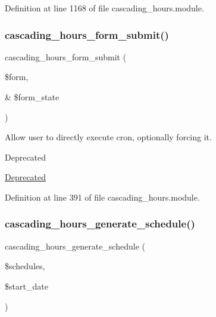 Definition at line 1168 of file cascading\+\_\+hours.\+module.

\mbox{\label{cascading__hours_8module_adb3cde4f8150586f9a97b429e9b35a62_adb3cde4f8150586f9a97b429e9b35a62}} 
\subsubsection{\texorpdfstring{cascading\+\_\+hours\+\_\+form\+\_\+submit()}{cascading\_hours\_form\_submit()}}
{\footnotesize\ttfamily cascading\+\_\+hours\+\_\+form\+\_\+submit (\begin{DoxyParamCaption}\item[{}]{\$form,  }\item[{\&}]{\$form\+\_\+state }\end{DoxyParamCaption})}



Allow user to directly execute cron, optionally forcing it. 

\begin{DoxyRefDesc}{Deprecated}
\item[\hyperlink{deprecated__deprecated000002}{Deprecated}]\end{DoxyRefDesc}


Definition at line 391 of file cascading\+\_\+hours.\+module.

\mbox{\label{cascading__hours_8module_aad69670d192753a4e14ef0504de71a13_aad69670d192753a4e14ef0504de71a13}} 
\subsubsection{\texorpdfstring{cascading\+\_\+hours\+\_\+generate\+\_\+schedule()}{cascading\_hours\_generate\_schedule()}}
{\footnotesize\ttfamily cascading\+\_\+hours\+\_\+generate\+\_\+schedule (\begin{DoxyParamCaption}\item[{}]{\$schedules,  }\item[{}]{\$start\+\_\+date }\end{DoxyParamCaption})}



